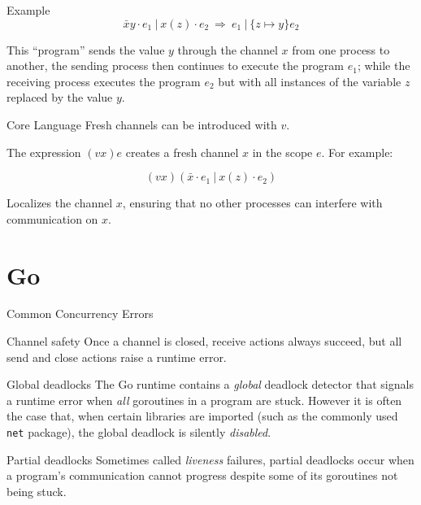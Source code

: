 \documentclass[bigger]{beamer}
\begin{document}
\begin{frame}[label={sec:orgec64900}]{Example}
\begin{equation*}
\bar{x}y \cdot e_1 \ |\ x(z) \cdot e_2 \ \Rightarrow \ e_1 \ |\  \{z \mapsto y\} e_2
\end{equation*}

This ``program'' sends the value \(y\) through the channel \(x\) from one process
to another, the sending process then continues to execute the program \(e_1\);
while the receiving process executes the program \(e_2\) but with all instances
of the variable \(z\) replaced by the value \(y\).
\end{frame}

\begin{frame}[label={sec:org569e2fe}]{Core Language}
Fresh channels can be introduced with \(v\).

The expression \((vx)e\) creates a fresh channel \(x\) in the scope \(e\).
For example:

\begin{equation*}
(vx)(\bar{x}\cdot e_1\ |\ x(z)\cdot e_2)
\end{equation*}

Localizes the channel \(x\), ensuring that no other processes can interfere with
communication on \(x\).
\end{frame}

\section{Go}
\label{sec:orgec5fc79}

\begin{frame}[label={sec:orge99e31e},fragile]{Common Concurrency Errors}
 \begin{block}{Channel safety}
Once a channel is closed, receive actions always succeed, but all send
and close actions raise a runtime error.
\end{block}

\begin{block}{Global deadlocks}
The Go runtime contains a \emph{global} deadlock detector that signals
a runtime error when \emph{all} goroutines in a program are stuck. However
it is often the case that, when certain libraries are imported (such as
the commonly used \texttt{net} package), the global deadlock is silently \emph{disabled}.
\end{block}

\begin{block}{Partial deadlocks}
Sometimes called \emph{liveness} failures, partial deadlocks occur when a program's
communication cannot progress despite some of its goroutines not being stuck.
\end{block}
\end{frame}
\end{document}
